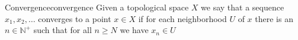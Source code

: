 \begin{definition}{Convergence}{convergence}
Given a topological space \( X \) we say that a sequence \( x _{ 1 } , x _{  2 }
, \ldots  \) converges to a point \( x \in  X \) if for each neighborhood \( U
\) of \( x \) there is an \( n \in \mathbb{N} ^{ + }  \) such that for all \( n
\ge N\) we have \( x _{ n } \in  U \) 
\end{definition}
